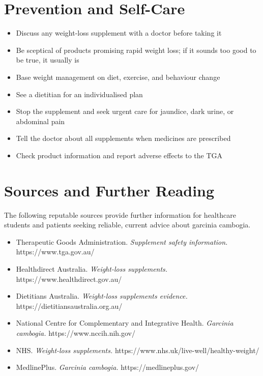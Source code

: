 \section*{Prevention and Self-Care}
\begin{itemize}
    \item Discuss any weight-loss supplement with a doctor before taking it
    \item Be sceptical of products promising rapid weight loss; if it sounds too good to be true, it usually is
    \item Base weight management on diet, exercise, and behaviour change
    \item See a dietitian for an individualised plan
    \item Stop the supplement and seek urgent care for jaundice, dark urine, or abdominal pain
    \item Tell the doctor about all supplements when medicines are prescribed
    \item Check product information and report adverse effects to the TGA
\end{itemize}

\section*{Sources and Further Reading}
The following reputable sources provide further information for healthcare students and patients seeking reliable, current advice about garcinia cambogia.
\begin{itemize}
    \item Therapeutic Goods Administration. \textit{Supplement safety information.} https://www.tga.gov.au/
    \item Healthdirect Australia. \textit{Weight-loss supplements.} https://www.healthdirect.gov.au/
    \item Dietitians Australia. \textit{Weight-loss supplements evidence.} https://dietitiansaustralia.org.au/
    \item National Centre for Complementary and Integrative Health. \textit{Garcinia cambogia.} https://www.nccih.nih.gov/
    \item NHS. \textit{Weight-loss supplements.} https://www.nhs.uk/live-well/healthy-weight/
    \item MedlinePlus. \textit{Garcinia cambogia.} https://medlineplus.gov/
\end{itemize}
